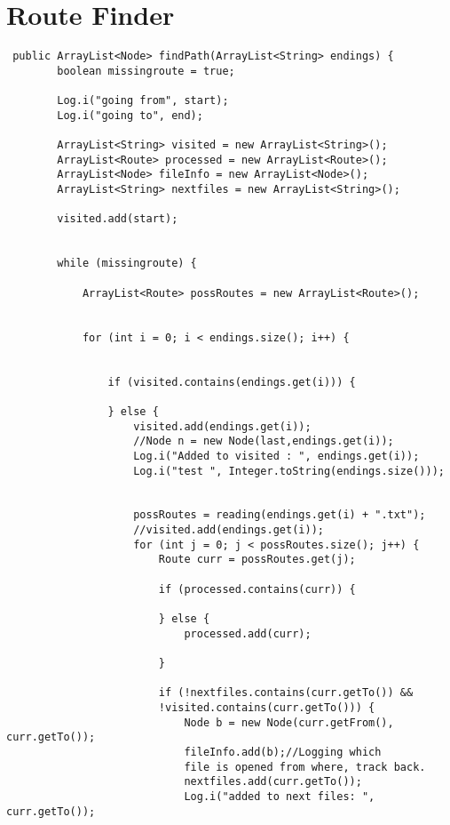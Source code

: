 \section{Route Finder}
\begin{lstlisting}
 public ArrayList<Node> findPath(ArrayList<String> endings) {
        boolean missingroute = true;

        Log.i("going from", start);
        Log.i("going to", end);

        ArrayList<String> visited = new ArrayList<String>();
        ArrayList<Route> processed = new ArrayList<Route>();
        ArrayList<Node> fileInfo = new ArrayList<Node>();
        ArrayList<String> nextfiles = new ArrayList<String>();

        visited.add(start);


        while (missingroute) {

            ArrayList<Route> possRoutes = new ArrayList<Route>(); 


            for (int i = 0; i < endings.size(); i++) {


                if (visited.contains(endings.get(i))) {
                    
                } else {
                    visited.add(endings.get(i));
                    //Node n = new Node(last,endings.get(i));
                    Log.i("Added to visited : ", endings.get(i));
                    Log.i("test ", Integer.toString(endings.size()));


                    possRoutes = reading(endings.get(i) + ".txt");
                    //visited.add(endings.get(i));
                    for (int j = 0; j < possRoutes.size(); j++) {
                        Route curr = possRoutes.get(j);
                       
                        if (processed.contains(curr)) {

                        } else {
                            processed.add(curr);
                            
                        }

                        if (!nextfiles.contains(curr.getTo()) && 
                        !visited.contains(curr.getTo())) {
                            Node b = new Node(curr.getFrom(), curr.getTo());
                            fileInfo.add(b);//Logging which 
                            file is opened from where, track back.
                            nextfiles.add(curr.getTo());
                            Log.i("added to next files: ", curr.getTo());


\end{lstlisting}
